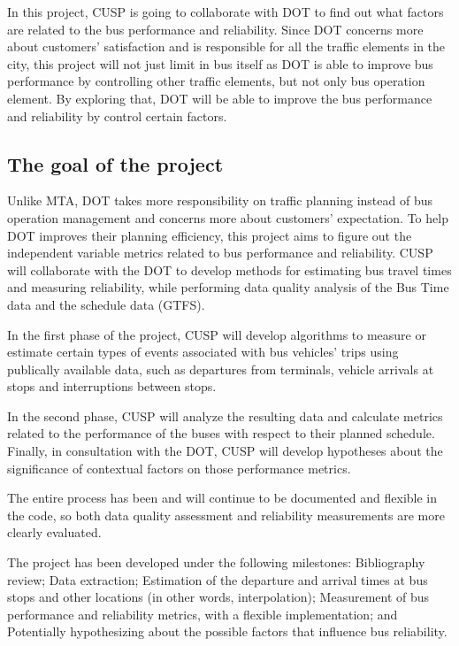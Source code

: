 \documentclass[12pt]{report}
\begin{document}
In this project, CUSP is going to collaborate with DOT to find out what factors are related to the bus performance and reliability. Since DOT concerns more about customers' satisfaction and is responsible for all the traffic elements in the city, this project will not just limit in bus itself as DOT is able to improve bus performance by controlling other traffic elements, but not only bus operation element. By exploring that, DOT will be able to improve the bus performance and reliability by control certain factors.

\subsection{The goal of the project }

Unlike MTA, DOT takes more responsibility on traffic planning instead of bus operation management and concerns more about customers' expectation. To help DOT improves their planning efficiency, this project aims to figure out the independent variable metrics related to bus performance and reliability. CUSP will collaborate with the DOT to develop methods for estimating bus travel times and measuring reliability, while performing data quality analysis of the Bus Time data and the schedule data (GTFS). 

In the first phase of the project, CUSP will develop algorithms to measure or estimate certain types of events associated with bus vehicles' trips using publically­ available data, such as departures from terminals, vehicle arrivals at stops and interruptions between stops.  

In the second phase, CUSP will analyze the resulting data and calculate metrics related to the performance of the buses with respect to their planned schedule.  Finally, in consultation with the DOT, CUSP will develop hypotheses about the significance of contextual factors on those performance metrics.

The entire process has been and will continue to be documented and flexible in the code, so both data quality assessment and reliability measurements are more clearly evaluated.

The project has been developed under the following milestones: Bibliography review; Data extraction; Estimation of the departure and arrival times at bus stops and other locations (in other words, interpolation); Measurement of bus performance and reliability metrics, with a flexible implementation; and Potentially hypothesizing about the possible factors that influence bus reliability.
\end{document}
